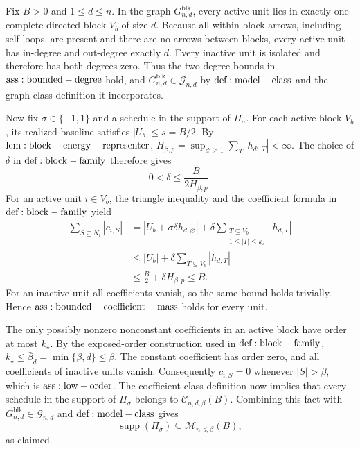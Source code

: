 Fix \(B>0\) and \(1\le d\le n\). In the graph \(G_{n,d}^{\mathrm{blk}}\), every active unit lies in exactly one complete directed block \(V_b\) of size \(d\). Because all within-block arrows, including self-loops, are present and there are no arrows between blocks, every active unit has in-degree and out-degree exactly \(d\). Every inactive unit is isolated and therefore has both degrees zero. Thus the two degree bounds in \({\rm ass:bounded-degree}\) hold, and \(G_{n,d}^{\mathrm{blk}}\in\mathcal G_{n,d}\) by \({\rm def:model-class}\) and the graph-class definition it incorporates.

Now fix \(\sigma\in\{-1,1\}\) and a schedule in the support of \(\Pi_\sigma\). For each active block \(V_b\), its realized baseline satisfies \(|U_b|\le s=B/2\). By \({\rm lem:block-energy-representer}\), \(H_{\beta,p}=\sup_{d'\ge1}\sum_T|h_{d',T}|<\infty\). The choice of \(\delta\) in \({\rm def:block-family}\) therefore gives
\[
0<\delta\le \frac{B}{2H_{\beta,p}}.
\]
For an active unit \(i\in V_b\), the triangle inequality and the coefficient formula in \({\rm def:block-family}\) yield
\[
\begin{aligned}
\sum_{S\subseteq N_i}|c_{i,S}|
&=\left|U_b+\sigma\delta h_{d,\varnothing}\right|
  +\delta\sum_{\substack{T\subseteq V_b\\1\le |T|\le k_\star}}|h_{d,T}|\\
&\le |U_b|+\delta\sum_{T\subseteq V_b}|h_{d,T}|\\
&\le \frac B2+\delta H_{\beta,p}\le B.
\end{aligned}
\]
For an inactive unit all coefficients vanish, so the same bound holds trivially. Hence \({\rm ass:bounded-coefficient-mass}\) holds for every unit.

The only possibly nonzero nonconstant coefficients in an active block have order at most \(k_\star\). By the exposed-order construction used in \({\rm def:block-family}\), \(k_\star\le\bar\beta_d=\min\{\beta,d\}\le\beta\). The constant coefficient has order zero, and all coefficients of inactive units vanish. Consequently \(c_{i,S}=0\) whenever \(|S|>\beta\), which is \({\rm ass:low-order}\). The coefficient-class definition now implies that every schedule in the support of \(\Pi_\sigma\) belongs to \(\mathcal C_{n,d,\beta}(B)\). Combining this fact with \(G_{n,d}^{\mathrm{blk}}\in\mathcal G_{n,d}\) and \({\rm def:model-class}\) gives
\[
\operatorname{supp}(\Pi_\sigma)\subseteq\mathcal M_{n,d,\beta}(B),
\]
as claimed.
